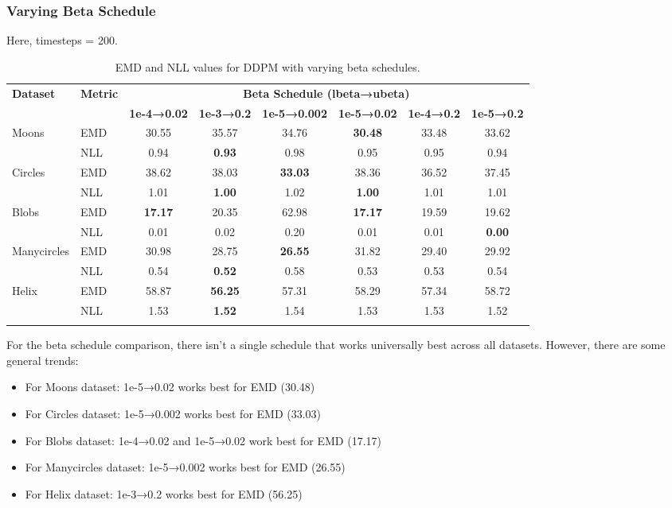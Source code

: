 \documentclass[11pt]{article}
\begin{document}
\newpage

\subsubsection{Varying Beta Schedule}
Here, timesteps = 200.

\begin{longtable}{|l|l|c|c|c|c|c|c|}
    \hline
     \textbf{Dataset} & \textbf{Metric} & \multicolumn{6}{c|}{\textbf{Beta Schedule (lbeta→ubeta)}} \\
     \cline{3-8}
     & & \textbf{1e-4→0.02} & \textbf{1e-3→0.2} & \textbf{1e-5→0.002} & \textbf{1e-5→0.02} & \textbf{1e-4→0.2} & \textbf{1e-5→0.2} \\
    \hline
        \multirow{2}{*}{Moons} & EMD & 30.55 & 35.57 & 34.76 & \textbf{30.48} & 33.48 & 33.62 \\
        \cline{2-8}
        & NLL & 0.94 & \textbf{0.93} & 0.98 & 0.95 & 0.95 & 0.94 \\
        \hline
        \multirow{2}{*}{Circles} & EMD & 38.62 & 38.03 & \textbf{33.03} & 38.36 & 36.52 & 37.45 \\
        \cline{2-8}
        & NLL & 1.01 & \textbf{1.00} & 1.02 & \textbf{1.00} & 1.01 & 1.01 \\
        \hline
        \multirow{2}{*}{Blobs} & EMD & \textbf{17.17} & 20.35 & 62.98 & \textbf{17.17} & 19.59 & 19.62 \\
        \cline{2-8}
        & NLL & 0.01 & 0.02 & 0.20 & 0.01 & 0.01 & \textbf{0.00} \\
        \hline
        \multirow{2}{*}{Manycircles} & EMD & 30.98 & 28.75 & \textbf{26.55} & 31.82 & 29.40 & 29.92 \\
        \cline{2-8}
        & NLL & 0.54 & \textbf{0.52} & 0.58 & 0.53 & 0.53 & 0.54 \\
        \hline
        \multirow{2}{*}{Helix} & EMD & 58.87 & \textbf{56.25} & 57.31 & 58.29 & 57.34 & 58.72 \\
        \cline{2-8}
        & NLL & 1.53 & \textbf{1.52} & 1.54 & 1.53 & 1.53 & 1.52 \\
        \hline
        \caption{EMD and NLL values for DDPM with varying beta schedules.}
\end{longtable}

For the beta schedule comparison, there isn't a single schedule that works universally best across all datasets. However, there are some general trends:

\begin{itemize}
    \item For Moons dataset: 1e-5→0.02 works best for EMD (30.48)
    \item For Circles dataset: 1e-5→0.002 works best for EMD (33.03)
    \item For Blobs dataset: 1e-4→0.02 and 1e-5→0.02 work best for EMD (17.17)
    \item For Manycircles dataset: 1e-5→0.002 works best for EMD (26.55)
    \item For Helix dataset: 1e-3→0.2 works best for EMD (56.25)
\end{itemize}
\end{document}
